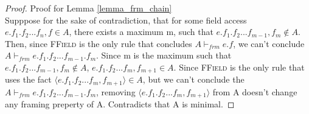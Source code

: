 \documentclass {article}
\newcommand{\frm}{\vdash_{frm}}
\begin{document}
\begin{proof} Proof for Lemma \ref{lemma_frm_chain}\\
Supppose for the sake of contradiction, that for some field access $e.f_1.f_2...f_n, f \in A$, there exists a maximum m, such that $e.f_1.f_2...f_{m-1}, f_m \notin A$. Then, since \textsc{FField} is the only rule that concludes $A \frm e.f$, we can't conclude $A \frm e.f_1.f_2...f_{m-1}.f_m$. Since m is the maximum such that $e.f_1.f_2...f_{m-1}, f_m \notin A$, $e.f_1.f_2...f_{m}, f_{m+1} \in A$. Since \textsc{FField} is the only rule that uses the fact $\langle e.f_1.f_2...f_m,f_{m+1} \rangle \in A$, but we can't conclude the $A \frm e.f_1.f_2...f_{m-1}.f_m$, removing $\langle e.f_1.f_2...f_m,f_{m+1} \rangle$ from A doesn't change any framing preperty of A. Contradicts that A is minimal.
\end{proof}
\end{document}
